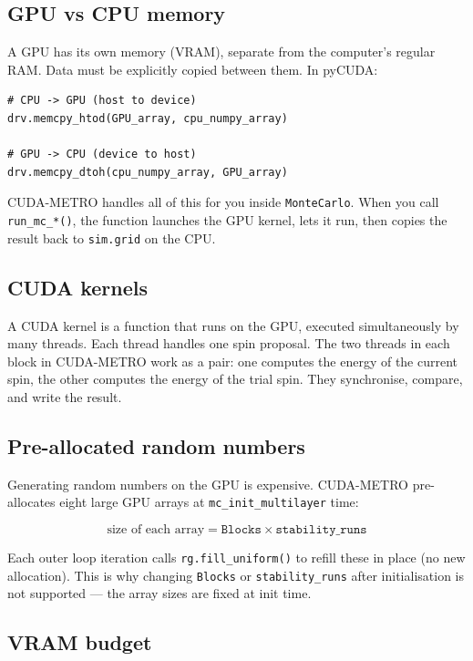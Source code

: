 \documentclass[12pt,a4paper]{article}
\newcommand{\code}[1]{\texttt{#1}}
\newcommand{\param}[1]{\texttt{#1}}
\begin{document}
\subsection{GPU vs CPU memory}

A GPU has its own memory (VRAM), separate from the computer's regular RAM. Data
must be explicitly copied between them. In pyCUDA:

\begin{lstlisting}[style=python]
# CPU -> GPU (host to device)
drv.memcpy_htod(GPU_array, cpu_numpy_array)

# GPU -> CPU (device to host)
drv.memcpy_dtoh(cpu_numpy_array, GPU_array)
\end{lstlisting}

CUDA-METRO handles all of this for you inside \code{MonteCarlo}. When you call
\code{run\_mc\_*()}, the function launches the GPU kernel, lets it run, then
copies the result back to \code{sim.grid} on the CPU.

\subsection{CUDA kernels}

A CUDA kernel is a function that runs on the GPU, executed simultaneously by
many threads. Each thread handles one spin proposal. The two threads in each
block in CUDA-METRO work as a pair: one computes the energy of the current
spin, the other computes the energy of the trial spin. They synchronise,
compare, and write the result.

\subsection{Pre-allocated random numbers}

Generating random numbers on the GPU is expensive. CUDA-METRO pre-allocates
eight large GPU arrays at \code{mc\_init\_multilayer} time:

\[
\text{size of each array} = \texttt{Blocks} \times \texttt{stability\_runs}
\]

Each outer loop iteration calls \code{rg.fill\_uniform()} to refill these in
place (no new allocation). This is why changing \param{Blocks} or
\param{stability\_runs} after initialisation is not supported --- the array
sizes are fixed at init time.

\subsection{VRAM budget}
\end{document}
